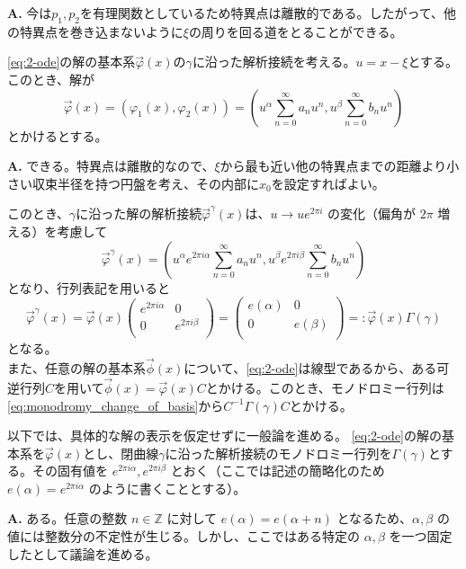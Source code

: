 \begin{Q}
\textbf{A.} 今は$p_{1}, p_{2}$を有理関数としているため特異点は離散的である。したがって、他の特異点を巻き込まないように$\xi$の周りを回る道をとることができる。
\end{Q}

\eqref{eq:2-ode}の解の基本系$\vec{\varphi}(x)$の$\gamma$に沿った解析接続を考える。$u=x-\xi$とする。このとき、解が
\[
\vec{\varphi}(x)=(\varphi_{1}(x),\varphi_{2}(x))=\left(u^{\alpha}\sum_{n=0}^{\infty}a_{n}u^{n},u^{\beta}\sum_{n=0}^{\infty}b_{n}u^{n}\right)
\]
とかけるとする。

\begin{Q}
\textbf{A.} できる。特異点は離散的なので、$\xi$から最も近い他の特異点までの距離より小さい収束半径を持つ円盤を考え、その内部に$x_{0}$を設定すればよい。
\end{Q}

このとき、$\gamma$に沿った解の解析接続$\vec{\varphi}^{\gamma}(x)$は、$u \to ue^{2\pi i}$ の変化（偏角が $2\pi$ 増える）を考慮して
\[
\vec{\varphi}^{\gamma}(x)=\left(u^{\alpha}e^{2\pi i\alpha}\sum_{n=0}^{\infty}a_{n}u^{n},u^{\beta}e^{2\pi i\beta}\sum_{n=0}^{\infty}b_{n}u^{n}\right)
\]
となり、行列表記を用いると
\[
\vec{\varphi}^{\gamma}(x)=\vec{\varphi}(x)
\begin{pmatrix}
    e^{2\pi i\alpha} & 0 \\
    0 & e^{2\pi i\beta} \\
\end{pmatrix}
=
\begin{pmatrix}
    e(\alpha) & 0 \\
    0 & e(\beta) \\
\end{pmatrix}
=:\vec{\varphi}(x)\Gamma(\gamma)
\]
となる。\\
また、任意の解の基本系$\vec{\phi}(x)$について、\eqref{eq:2-ode}は線型であるから、ある可逆行列$C$を用いて$\vec{\phi}(x)=\vec{\varphi}(x)C$とかける。このとき、モノドロミー行列は\eqref{eq:monodromy_change_of_basis}から$C^{-1}\Gamma(\gamma) C$とかける。

以下では、具体的な解の表示を仮定せずに一般論を進める。
\eqref{eq:2-ode}の解の基本系を$\vec{\varphi}(x)$とし、閉曲線$\gamma$に沿った解析接続のモノドロミー行列を$\Gamma(\gamma)$とする。その固有値を $e^{2\pi i \alpha}, e^{2\pi i \beta}$ とおく（ここでは記述の簡略化のため $e(\alpha)=e^{2\pi i \alpha}$ のように書くこととする）。

\begin{Q}
\textbf{A.} ある。任意の整数 $n \in \mathbb{Z}$ に対して $e(\alpha) = e(\alpha+n)$ となるため、$\alpha, \beta$ の値には整数分の不定性が生じる。しかし、ここではある特定の $\alpha, \beta$ を一つ固定したとして議論を進める。
\end{Q}

